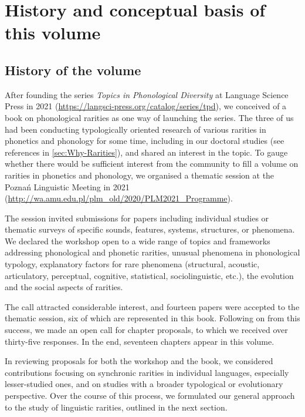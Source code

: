 \documentclass[output=paper]{langscibook}
\begin{document}
\section{History and conceptual basis of this volume}
\label{sec:Hist-Concept-Volume}
\subsection{History of the volume}
\label{sec:Hist-Volume}

After founding the series \textit{Topics in Phonological Diversity} at Language Science Press in 2021 (\url{https://langsci-press.org/catalog/series/tpd}), we conceived of a book on phonological rarities as one way of launching the series. The three of us had been conducting typologically oriented research of various rarities in phonetics and phonology for some time, including in our doctoral studies (see references in \cref{sec:Why-Rarities}), and shared an interest in the topic. To gauge whether there would be sufficient interest from the community to fill a volume on rarities in phonetics and phonology, we organised a thematic session at the Poznań Linguistic Meeting in 2021 (\url{http://wa.amu.edu.pl/plm_old/2020/PLM2021_Programme}).

The session invited submissions for papers including individual studies or thematic surveys of specific sounds, features, systems, structures, or phenomena. We declared the workshop open to a wide range of topics and frameworks addressing phonological and phonetic rarities, unusual phenomena in phonological typology, explanatory factors for rare phenomena (structural, acoustic, articulatory, perceptual, cognitive, statistical, sociolinguistic, etc.), the evolution and the social aspects of rarities.

The call attracted considerable interest, and fourteen papers were accepted to the thematic session, six of which are represented in this book. Following on from this success, we made an open call for chapter proposals, to which we received over thirty-five responses. In the end, seventeen chapters appear in this volume.

In reviewing proposals for both the workshop and the book, we considered contributions focusing on synchronic rarities in individual languages, especially lesser-studied ones, and on studies with a broader typological or evolutionary perspective. Over the course of this process, we formulated our general approach to the study of linguistic rarities, outlined in the next section.
\end{document}
